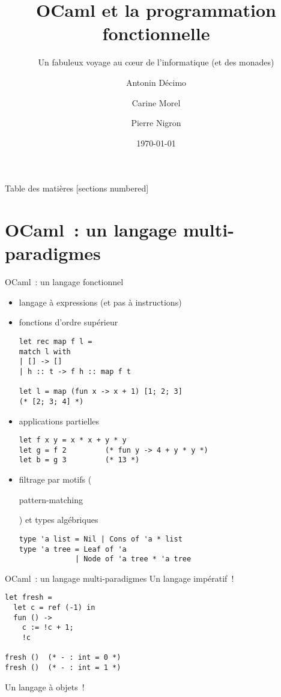 \documentclass[10pt]{beamer}
\title{OCaml et la programmation fonctionnelle}
\subtitle{Un fabuleux voyage au cœur de l’informatique (et des monades)}
\date{\today}
\author{Antonin Décimo \and Carine Morel \and Pierre Nigron}
\institute{Université Paris Diderot}
\begin{document}
\maketitle

\begin{frame}{Table des matières}
  [sections numbered]
  \tableofcontents[hideallsubsections]
\end{frame}

\section{OCaml~: un langage multi-paradigmes}

\begin{frame}[fragile]{OCaml~: un langage fonctionnel}
  \begin{itemize}
  \item<1-> langage à expressions (et pas à instructions)
  \item<2-> fonctions d'ordre supérieur
\begin{verbatim}
let rec map f l =
match l with
| [] -> []
| h :: t -> f h :: map f t

let l = map (fun x -> x + 1) [1; 2; 3]
(* [2; 3; 4] *)
\end{verbatim}
  \item<3-> applications partielles
\begin{verbatim}
let f x y = x * x + y * y
let g = f 2         (* fun y -> 4 + y * y *)
let b = g 3         (* 13 *)
\end{verbatim}
  \item<4-> filtrage par motifs
    (\begin{english}pattern-matching\end{english}) et types
    algébriques
\begin{verbatim}
type 'a list = Nil | Cons of 'a * list
type 'a tree = Leaf of 'a
             | Node of 'a tree * 'a tree
\end{verbatim}
  \end{itemize}
\end{frame}

\begin{frame}[fragile]{OCaml~: un langage multi-paradigmes}
  Un langage impératif~!
\begin{verbatim}
let fresh =
  let c = ref (-1) in
  fun () ->
    c := !c + 1;
    !c

fresh ()  (* - : int = 0 *)
fresh ()  (* - : int = 1 *)
\end{verbatim}

  Un langage à objets~!
\end{frame}
\end{document}
